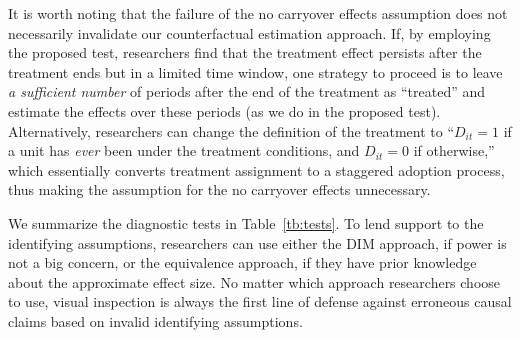 \documentclass[12pt]{article}
\begin{document}
It is worth noting that the failure of the no carryover effects assumption does not necessarily invalidate our counterfactual estimation approach. If, by employing the proposed test, researchers find that the treatment effect persists after the treatment ends but in a limited time window, one strategy to proceed is to leave \emph{a sufficient number} of periods after the end of the treatment as ``treated'' and estimate the effects over these periods (as we do in the proposed test). Alternatively, researchers can change the definition of the treatment to ``$D_{it} = 1$ if a unit has \emph{ever} been under the treatment conditions, and $D_{it} = 0$ if otherwise,'' which essentially converts treatment assignment to a staggered adoption process, thus making the assumption for the no carryover effects unnecessary. 

We summarize the diagnostic tests in Table~\ref{tb:tests}. To lend support to the identifying assumptions, researchers can use either the DIM approach, if power is not a big concern, or the equivalence approach, if they have prior knowledge about the approximate effect size. No matter which approach researchers choose to use, visual inspection is always the first line of defense against erroneous causal claims based on invalid identifying assumptions. 
\end{document}
